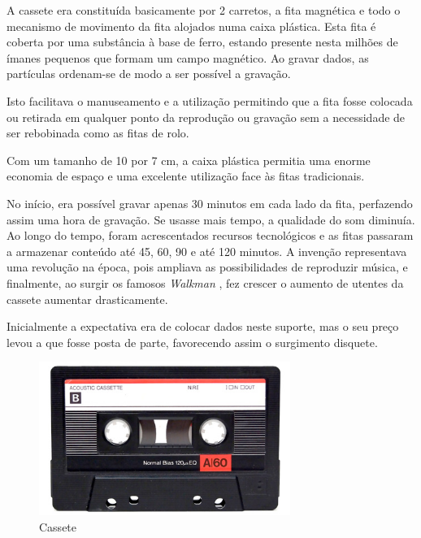 \documentclass{report}
\begin{document}
	A cassete era constituída basicamente por 2 carretos, a fita magnética e todo o mecanismo de movimento da fita alojados numa caixa plástica. Esta fita é coberta por uma substância à base de ferro, estando presente nesta milhões de ímanes pequenos que formam um campo magnético. Ao gravar dados, as partículas ordenam-se de modo a ser possível a gravação.
\vspace{1mm}

	Isto facilitava o manuseamento e a utilização permitindo que a fita fosse colocada ou retirada em qualquer ponto da reprodução ou gravação sem a necessidade de ser rebobinada como as fitas de rolo. 
\vspace{1mm}
	
	Com um tamanho de 10 por 7 cm, a caixa plástica permitia uma enorme economia de espaço e uma excelente utilização face às fitas tradicionais.
\vspace{1mm}

	No início, era possível gravar apenas 30 minutos em cada lado da fita, perfazendo assim uma hora de gravação. Se usasse mais tempo, a qualidade do som diminuía. Ao longo do tempo, foram acrescentados recursos tecnológicos e as fitas passaram a armazenar conteúdo até 45, 60, 90 e até 120 minutos. A invenção representava uma revolução na época, pois ampliava as possibilidades de reproduzir música, e finalmente, ao surgir os famosos \textit{Walkman}  , fez crescer o aumento de utentes da cassete aumentar drasticamente.
\vspace{1mm}

	Inicialmente a expectativa era de colocar dados neste suporte, mas o seu preço levou a que fosse posta de parte, favorecendo assim o surgimento disquete.
	
	\begin{figure} [h]
		\centering
		\includegraphics[width=8.19cm, height=5cm]{cassete.jpg}
		\caption{Cassete}
	\end{figure}		
		
\newpage
\end{document}
